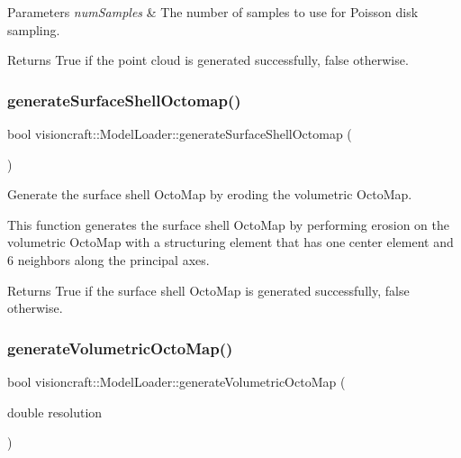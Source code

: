 \begin{DoxyParams}{Parameters}
{\em num\+Samples} & The number of samples to use for Poisson disk sampling. \\
\hline
\end{DoxyParams}
\begin{DoxyReturn}{Returns}
True if the point cloud is generated successfully, false otherwise. 
\end{DoxyReturn}
\mbox{\label{classvisioncraft_1_1ModelLoader_a5ccc885b3c8871366bca80aef0134a11}} 
\subsubsection{\texorpdfstring{generate\+Surface\+Shell\+Octomap()}{generateSurfaceShellOctomap()}}
{\footnotesize\ttfamily bool visioncraft\+::\+Model\+Loader\+::generate\+Surface\+Shell\+Octomap (\begin{DoxyParamCaption}{ }\end{DoxyParamCaption})}



Generate the surface shell Octo\+Map by eroding the volumetric Octo\+Map. 

This function generates the surface shell Octo\+Map by performing erosion on the volumetric Octo\+Map with a structuring element that has one center element and 6 neighbors along the principal axes.

\begin{DoxyReturn}{Returns}
True if the surface shell Octo\+Map is generated successfully, false otherwise. 
\end{DoxyReturn}
\mbox{\label{classvisioncraft_1_1ModelLoader_a66caf48531a5fb73dd3d8ad17540592f}} 
\subsubsection{\texorpdfstring{generate\+Volumetric\+Octo\+Map()}{generateVolumetricOctoMap()}}
{\footnotesize\ttfamily bool visioncraft\+::\+Model\+Loader\+::generate\+Volumetric\+Octo\+Map (\begin{DoxyParamCaption}\item[{double}]{resolution }\end{DoxyParamCaption})}



